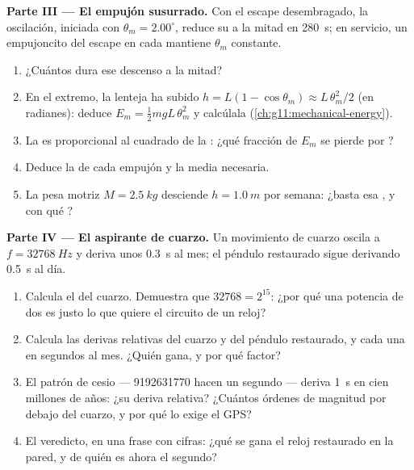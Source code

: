 \begin{problem}
\medskip
\noindent\textbf{Parte III --- El empujón susurrado.} Con el escape desembragado, la
oscilación, iniciada con  $\theta_m = 2.00^\circ$, reduce su  a la
mitad en \qty{280}{s}; en servicio, un empujoncito del escape en cada  mantiene
$\theta_m$ constante.
\begin{enumerate}[resume]
  \item ¿Cuántos  dura ese descenso a la mitad?
  \item En el extremo, la lenteja ha subido $h = L(1 - \cos\theta_m) \approx
        L\,\theta_m^2/2$ (en radianes): deduce $E_m = \tfrac12 m g L\,\theta_m^2$ y
        calcúlala (\cref{ch:g11:mechanical-energy}).
  \item La  es proporcional al cuadrado de la : ¿qué fracción de $E_m$
        se pierde por ?
  \item Deduce la  de cada empujón y la  media necesaria.
  \item La pesa motriz $M = \qty{2.5}{kg}$ desciende $h = \qty{1.0}{m}$ por semana:
        ¿basta esa , y con qué ?
\end{enumerate}

\medskip
\noindent\textbf{Parte IV --- El aspirante de cuarzo.} Un movimiento de cuarzo oscila
a $f = \qty{32768}{Hz}$ y deriva unos \qty{0.3}{s} al mes; el péndulo restaurado sigue
derivando \qty{0.5}{s} al día.
\begin{enumerate}[resume]
  \item Calcula el  del cuarzo. Demuestra que $\num{32768} = 2^{15}$: ¿por qué
        una potencia de dos es justo lo que quiere el circuito de un reloj?
  \item Calcula las derivas relativas del cuarzo y del péndulo restaurado, y cada una
        en segundos al mes. ¿Quién gana, y por qué factor?
  \item El patrón de cesio --- \num{9192631770}  hacen un segundo --- deriva
        \qty{1}{s} en cien millones de años: ¿su deriva relativa? ¿Cuántos órdenes de
        magnitud por debajo del cuarzo, y por qué lo exige el GPS?
  \item El veredicto, en una frase con cifras: ¿qué se gana el reloj restaurado en la
        pared, y de quién es ahora el segundo?
\end{enumerate}
\end{problem}
